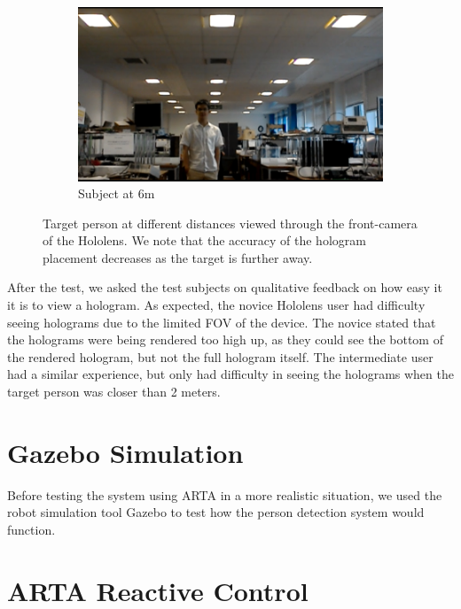 \begin{figure}[ht]
	\begin{subfigure}[b]{.32\textwidth}
		\centering
		\includegraphics[width=1.0\linewidth]{img/chapter6_test/marek2.png}
		\caption{Subject at 6m}
	\end{subfigure}
	\vspace{-1\baselineskip}
	\begin{center}
		\caption{Target person at different distances viewed through the front-camera of the Hololens. We note that the accuracy of the hologram placement decreases as the target is further away.}
		\label{fig:marek}
	\end{center}
	\vspace{-2\baselineskip}
\end{figure}

After the test, we asked the test subjects on qualitative feedback on how easy it it is to view a hologram. As expected, the novice Hololens user had difficulty seeing holograms due to the limited FOV of the device. The novice stated that the holograms were being rendered too high up, as they could see the bottom of the rendered hologram, but not the full hologram itself. The intermediate user had a similar experience, but only had difficulty in seeing the holograms when the target person was closer than 2 meters.

\section{Gazebo Simulation}
Before testing the system using ARTA in a more realistic situation, we used the robot simulation tool Gazebo to test how the person detection system would function.

\section{ARTA Reactive Control}